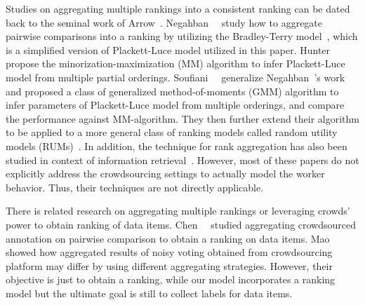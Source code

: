 Studies on aggregating multiple rankings into a consistent ranking can be dated back to the seminal work of Arrow~\cite{arrow2012social}.  
Negahban~\etal~\cite{negahban:nips2012} study how to aggregate pairwise comparisons into a ranking 
by utilizing the Bradley-Terry model~\cite{bradley:1952}, which is a simplified version of Plackett-Luce model utilized in this paper.   
Hunter~\etal~\cite{hunter:aos2004} propose the minorization-maximization (MM) algorithm to infer Plackett-Luce model 
from multiple partial orderings.  
Soufiani~\etal~\cite{soufiani:nips2013} generalize Negahban~\etal's work 
and proposed a class of generalized method-of-moments (GMM) algorithm 
to infer parameters of Plackett-Luce model from multiple orderings, 
and compare the performance against MM-algorithm.  
They then further extend their algorithm 
to be applied to a more general class of ranking models called random utility models (RUMs)~\cite{soufiani:icml2014}.  
In addition, the technique for rank aggregation has also been studied 
in context of information retrieval~\cite{dwork:www2001,klementiev:icml2008,liu:www2007,qin:nips2010,volkovs:www2012}.  
However, most of these papers do not explicitly address the crowdsourcing settings 
to actually model the worker behavior.  
Thus, their techniques are not directly applicable. 

There is related research on aggregating multiple rankings or leveraging crowds' power to obtain ranking of data items.  
Chen~\etal~\cite{chen:wsdm2013} studied aggregating crowdsourced annotation on pairwise comparison to obtain a ranking on data items. 
Mao~\etal~\cite{mao:aaai2013} showed how aggregated results of noisy voting obtained from crowdsourcing platform 
may differ by using different aggregating strategies.  
However, their objective is just to obtain a ranking, 
while our model incorporates a ranking model but the ultimate goal is still to collect labels for data items.  



